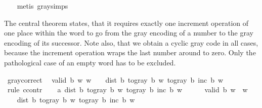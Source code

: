 \begin{isabellebody}
%
\isadelimproof
\ \ %
\endisadelimproof
%
\isatagproof
{}\isamarkupfalse%
\ {\isacharparenleft}{\kern0pt}metis\ gray{\isacharunderscore}{\kern0pt}simps{\isacharparenright}{\kern0pt}%
\endisatagproof
{\isafoldproof}%
%
\isadelimproof
%
\endisadelimproof
%
\begin{isamarkuptext}%
The central theorem states, that it requires exactly one increment operation
  of one place within the word to go from the gray encoding of a number to
  the gray encoding of its successor.
Note also, that we obtain a cyclic gray code in all cases,
  because the increment operation wraps the last
  number around to zero.
Only the pathological case of an empty word has to be excluded.%
\end{isamarkuptext}\isamarkuptrue%
\isamarkupfalse%
\ gray{\isacharunderscore}{\kern0pt}correct{\isacharcolon}{\kern0pt}\isanewline
\ \ {\isachardoublequoteopen}{\isasymlbrakk}valid\ b\ w{\isacharsemicolon}{\kern0pt}\ w\ {\isasymnoteq}\ {\isacharbrackleft}{\kern0pt}{\isacharbrackright}{\kern0pt}{\isasymrbrakk}\ {\isasymLongrightarrow}\ dist\ b\ {\isacharparenleft}{\kern0pt}to{\isacharunderscore}{\kern0pt}gray\ b\ w{\isacharparenright}{\kern0pt}\ {\isacharparenleft}{\kern0pt}to{\isacharunderscore}{\kern0pt}gray\ b\ {\isacharparenleft}{\kern0pt}inc\ b\ w{\isacharparenright}{\kern0pt}{\isacharparenright}{\kern0pt}\ {\isacharequal}{\kern0pt}\ {}{\isachardoublequoteclose}\isanewline
%
\isadelimproof
%
\endisadelimproof
%
\isatagproof
{}\isamarkupfalse%
\ {\isacharparenleft}{\kern0pt}rule\ ccontr{\isacharparenright}{\kern0pt}\isanewline
\ \ \isamarkupfalse%
\ a{\isacharcolon}{\kern0pt}\ {\isachardoublequoteopen}dist\ b\ {\isacharparenleft}{\kern0pt}to{\isacharunderscore}{\kern0pt}gray\ b\ w{\isacharparenright}{\kern0pt}\ {\isacharparenleft}{\kern0pt}to{\isacharunderscore}{\kern0pt}gray\ b\ {\isacharparenleft}{\kern0pt}inc\ b\ w{\isacharparenright}{\kern0pt}{\isacharparenright}{\kern0pt}\ {\isasymnoteq}\ {}{\isachardoublequoteclose}\isanewline
\ \ \isamarkupfalse%
\ {\isachardoublequoteopen}valid\ b\ w{\isachardoublequoteclose}\ \ {\isachardoublequoteopen}w\ {\isasymnoteq}\ {\isacharbrackleft}{\kern0pt}{\isacharbrackright}{\kern0pt}{\isachardoublequoteclose}\isanewline
\ \ \isamarkupfalse%
\ {\isachardoublequoteopen}dist\ b\ {\isacharparenleft}{\kern0pt}to{\isacharunderscore}{\kern0pt}gray\ b\ w{\isacharparenright}{\kern0pt}\ {\isacharparenleft}{\kern0pt}to{\isacharunderscore}{\kern0pt}gray\ b\ {\isacharparenleft}{\kern0pt}inc\ b\ w{\isacharparenright}{\kern0pt}{\isacharparenright}{\kern0pt}\ {\isasymnoteq}\ {}{\isachardoublequoteclose}\ \isamarkupfalse%

\end{isabellebody}
